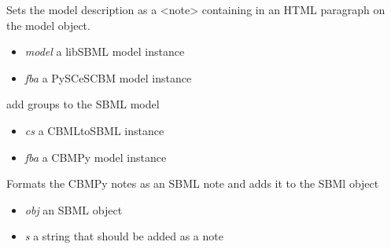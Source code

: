 \documentclass[a4paper,11pt,english]{sphinxmanual}
\begin{document}

\begin{fulllineitems}
\label{modules_doc:cbmpy.CBXML.sbml_setDescription}
Sets the model description as a \textless{}note\textgreater{} containing  in an HTML paragraph on the model object.
\begin{itemize}
\item {} 
\emph{model} a libSBML model instance

\item {} 
\emph{fba} a PySCeSCBM model instance

\end{itemize}

\end{fulllineitems}


\begin{fulllineitems}
\label{modules_doc:cbmpy.CBXML.sbml_setGroupsL3}
add groups to the SBML model
\begin{itemize}
\item {} 
\emph{cs} a CBMLtoSBML instance

\item {} 
\emph{fba} a CBMPy model instance

\end{itemize}

\end{fulllineitems}


\begin{fulllineitems}
\label{modules_doc:cbmpy.CBXML.sbml_setNotes3}
Formats the CBMPy notes as an SBML note and adds it to the SBMl object
\begin{itemize}
\item {} 
\emph{obj} an SBML object

\item {} 
\emph{s} a string that should be added as a note

\end{itemize}

\end{fulllineitems}
\end{document}
